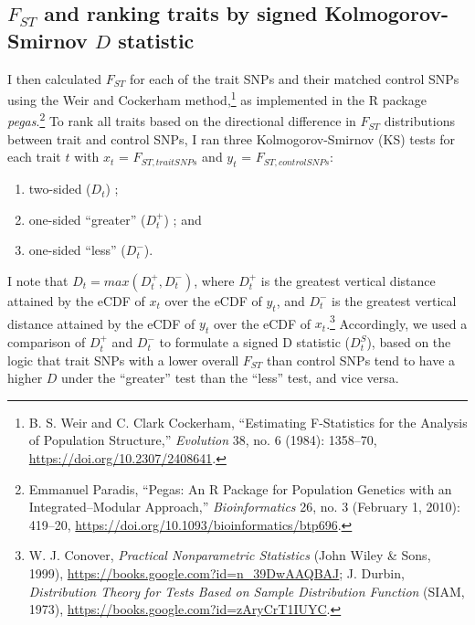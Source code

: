 \documentclass[
]{book}
\begin{document}
\hypertarget{f_st-and-ranking-traits-by-signed-kolmogorov-smirnov-d-statistic}{%
\subsection{\texorpdfstring{\(F_{ST}\) and ranking traits by signed Kolmogorov-Smirnov \(D\) statistic}{F\_\{ST\} and ranking traits by signed Kolmogorov-Smirnov D statistic}}\label{f_st-and-ranking-traits-by-signed-kolmogorov-smirnov-d-statistic}}

I then calculated \(F_{ST}\) for each of the trait SNPs and their matched control SNPs using the Weir and Cockerham method,\footnote{B. S. Weir and C. Clark Cockerham, {``Estimating {F-Statistics} for the {Analysis} of {Population Structure},''} \emph{Evolution} 38, no. 6 (1984): 1358--70, \url{https://doi.org/10.2307/2408641}.} as implemented in the R package \emph{pegas}.\footnote{Emmanuel Paradis, {``Pegas: An {R} Package for Population Genetics with an Integrated--Modular Approach,''} \emph{Bioinformatics} 26, no. 3 (February 1, 2010): 419--20, \url{https://doi.org/10.1093/bioinformatics/btp696}.} To rank all traits based on the directional difference in \(F_{ST}\) distributions between trait and control SNPs, I ran three Kolmogorov-Smirnov (KS) tests for each trait \(t\) with \(x_t\) = \(F_{ST, trait SNPs}\) and \(y_t\) = \(F_{ST, control SNPs}\):

\begin{enumerate}
\def\labelenumi{\arabic{enumi}.}
\item
  two-sided (\(D_t\)) ;
\item
  one-sided ``greater'' (\(D_t^+\)) ; and
\item
  one-sided ``less'' (\(D_t^-\)).
\end{enumerate}

I note that \(D_{t} = max(D_t^+, D_t^-)\), where \(D_t^+\) is the greatest vertical distance attained by the eCDF of \(x_t\) over the eCDF of \(y_t\), and \(D_t^-\) is the greatest vertical distance attained by the eCDF of \(y_t\) over the eCDF of \(x_t\).\footnote{W. J. Conover, \emph{Practical {Nonparametric Statistics}} ({John Wiley \& Sons}, 1999), \url{https://books.google.com?id=n_39DwAAQBAJ}; J. Durbin, \emph{Distribution {Theory} for {Tests Based} on {Sample Distribution Function}} ({SIAM}, 1973), \url{https://books.google.com?id=zAryCrT1IUYC}.} Accordingly, we used a comparison of \(D_t^+\) and \(D_t^-\) to formulate a signed D statistic (\(D_t^S\)), based on the logic that trait SNPs with a lower overall \(F_{ST}\) than control SNPs tend to have a higher \(D\) under the ``greater'' test than the ``less'' test, and vice versa.
\end{document}
